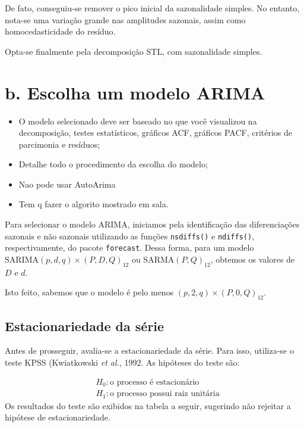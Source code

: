 \documentclass[
  letterpaper,
  DIV=11,
  numbers=noendperiod]{scrartcl}
\providecommand{\tightlist}{%
  \setlength{\itemsep}{0pt}\setlength{\parskip}{0pt}}\usepackage{longtable,booktabs,array}
\begin{document}
De fato, conseguiu-se remover o pico inicial da sazonalidade simples. No
entanto, nota-se uma variação grande nas amplitudes sazonais, assim como
homocedasticidade do resíduo.

Opta-se finalmente pela decomposição STL, com sazonalidade simples.

\hypertarget{b.-escolha-um-modelo-arima}{%
\section{b. Escolha um modelo ARIMA}\label{b.-escolha-um-modelo-arima}}

\begin{itemize}
\tightlist
\item
  O modelo selecionado deve ser baseado no que você visualizou na
  decomposição, testes estatísticos, gráficos ACF, gráficos PACF,
  critérios de parcimonia e resíduos;
\item
  Detalhe todo o procedimento da escolha do modelo;
\item
  Nao pode usar AutoArima
\item
  Tem q fazer o algorito mostrado em sala.
\end{itemize}

Para selecionar o modelo ARIMA, iniciamos pela identificação das
diferenciações sazonais e não sazonais utilizando as funções
\texttt{nsdiffs()} e \texttt{ndiffs()}, respectivamente, do pacote
\texttt{forecast}. Dessa forma, para um modelo
\(\text{SARIMA}(p,d,q)\times(P,D,Q)_{12}\) ou
\(\text{SARMA}(P,Q)_{12}\), obtemos os valores de \(D\) e \(d\).

Isto feito, sabemos que o modelo é pelo menos
\((p,2,q)\times(P,0,Q)_{12}\).

\hypertarget{estacionariedade-da-suxe9rie}{%
\subsection{Estacionariedade da
série}\label{estacionariedade-da-suxe9rie}}

Antes de prosseguir, avalia-se a estacionariedade da série. Para isso,
utiliza-se o teste KPSS (Kwiatkowski \emph{et al.}, 1992. As hipóteses
do teste são:

\[
\begin{aligned}
  &H_0: \text{o processo é estacionário} \\
  &H_1: \text{o processo possui raiz unitária}
\end{aligned}
\] Os resultados do teste são exibidos na tabela a seguir, sugerindo não
rejeitar a hipótese de estacionariedade.
\end{document}
